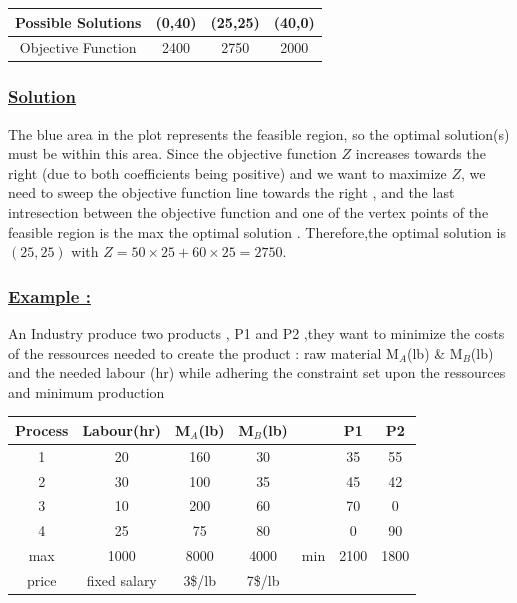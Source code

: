\vspace{0.75cm} 
\begin{center}
    \begin{tabular}{|c|c|c|c|}
        \hline 
        Possible Solutions  & (0,40) & (25,25) & (40,0) \\
        \hline 
        Objective Function & 2400 & 2750 & 2000 \\
        \hline 
    \end{tabular}
\end{center}
\newpage
\subsubsection*{\underline{Solution}}

The blue area in the plot represents the feasible region, so the optimal solution(s) must be within this area. Since
the objective function \( Z \) increases towards the right (due to both coefficients being positive) and we want to
maximize \( Z \), we need to sweep the objective function line towards the right , and the last intresection 
between the objective function and one of the vertex points of the feasible region is the max the optimal solution . 
Therefore,the optimal solution is \((25, 25)\) with \( Z = 50 \times 25 + 60 \times 25 = 2750 \).

\vspace{0.5cm}
\subsubsection*{\underline{Example :}}An Industry produce two products , P1 and P2 ,they want to minimize the costs
of the ressources needed to create the product : raw material M$_{A}$(lb) \& M$_{B}$(lb) and the needed labour (hr)
while adhering the constraint set upon the ressources and minimum production 

\vspace{0.75cm} 
\begin{center}
    \begin{tabular}{|c|c|c|c|c|c|c|}
        \hline 
        Process  & Labour(hr) & M$_{A}$(lb) & M$_{B}$(lb)& & P1 & P2 \\
        \hline 
        1 & 20 & 160 & 30 & &35 & 55 \\
        \hline 
        2 & 30 & 100 & 35 & &45 & 42 \\
        \hline 
        3 & 10 & 200 & 60 & &70 & 0 \\
        \hline
        4 & 25 & 75 & 80 & &0 & 90\\
        \hline
        max & 1000 & 8000 & 4000 & min & 2100 & 1800\\
        \hline
        price & fixed salary & 3\$/lb & 7\$/lb & & & \\
        \hline
    \end{tabular}
\end{center}

